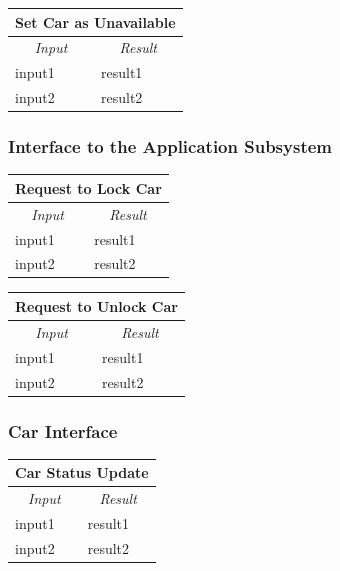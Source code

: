 \documentclass[english]{article}
\begin{document}
\begin{center}
	\begin{tabular}{ | m{6cm} | m{6cm} | }
		\hline
		\multicolumn{2}{|c|}{\textbf{Set Car as Unavailable}} \\
		\hline
		\multicolumn{1}{|c|}{\textit{Input}} & \multicolumn{1}{c|}{\textit{Result}} \\
		\hline
		input1 & result1 \\
		\hline
		input2 & result2 \\
		\hline
	\end{tabular}
\end{center}

\subsubsection{Interface to the Application Subsystem}
\begin{center}
	\begin{tabular}{ | m{6cm} | m{6cm} | }
		\hline
		\multicolumn{2}{|c|}{\textbf{Request to Lock Car}} \\
		\hline
		\multicolumn{1}{|c|}{\textit{Input}} & \multicolumn{1}{c|}{\textit{Result}} \\
		\hline
		input1 & result1 \\
		\hline
		input2 & result2 \\
		\hline
	\end{tabular}
\end{center}

\begin{center}
	\begin{tabular}{ | m{6cm} | m{6cm} | }
		\hline
		\multicolumn{2}{|c|}{\textbf{Request to Unlock Car}} \\
		\hline
		\multicolumn{1}{|c|}{\textit{Input}} & \multicolumn{1}{c|}{\textit{Result}} \\
		\hline
		input1 & result1 \\
		\hline
		input2 & result2 \\
		\hline
	\end{tabular}
\end{center}

\subsubsection{Car Interface}
\begin{center}
	\begin{tabular}{ | m{6cm} | m{6cm} | }
		\hline
		\multicolumn{2}{|c|}{\textbf{Car Status Update}} \\
		\hline
		\multicolumn{1}{|c|}{\textit{Input}} & \multicolumn{1}{c|}{\textit{Result}} \\
		\hline
		input1 & result1 \\
		\hline
		input2 & result2 \\
		\hline
	\end{tabular}
\end{center}
\end{document}
